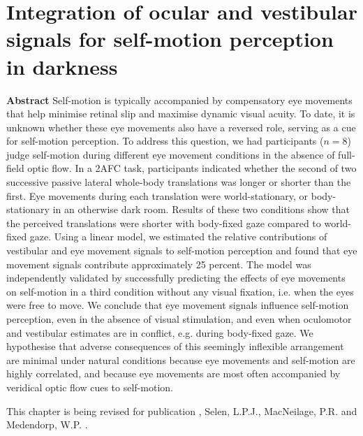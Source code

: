 
\chapter{Integration of ocular and vestibular signals for self-motion perception in darkness}
\chaptermark{}

\label{p3}

\newpage

\small {\bf Abstract} Self-motion is typically accompanied by compensatory eye movements that help minimise retinal slip and maximise dynamic visual acuity. To date, it is unknown whether these eye movements also have a reversed role, serving as a cue for self-motion perception. To address this question, we had participants ($n=8$) judge self-motion during different eye movement conditions in the absence of full-field optic flow.  In a 2AFC task, participants indicated whether the second of two successive passive lateral whole-body translations was longer or shorter than the first. Eye movements during each translation were world-stationary, or body-stationary in an otherwise dark room. Results of these two conditions show that the perceived translations were shorter with body-fixed gaze compared to world-fixed gaze. Using a linear model, we estimated the relative contributions of vestibular and eye movement signals to self-motion perception and found that eye movement signals contribute approximately 25 percent. The model was independently validated by successfully predicting the effects of eye movements on self-motion in a third condition without any visual fixation, i.e. when the eyes were free to move. We conclude that eye movement signals influence self-motion perception, even in the absence of visual stimulation, and even when oculomotor and vestibular estimates are in conflict, e.g. during body-fixed gaze. We hypothesise that adverse consequences of this seemingly inflexible arrangement are minimal under natural conditions because eye movements and self-motion are highly correlated, and because eye movements are most often accompanied by veridical optic flow cues to self-motion.

\vfill

\noindent\underline{ \hspace{4cm} }

\noindent This chapter is being revised for publication \newline
{}, Selen, L.P.J., MacNeilage, P.R. and Medendorp, W.P. \citeyear{clemens2015a}. %

